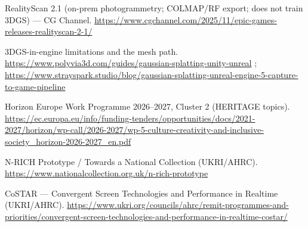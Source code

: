 \documentclass[a4paper,11pt]{article}
\begin{document}
\begin{enumerate}[leftmargin=2.2em,label={[\arabic*]}]
\item RealityScan 2.1 (on-prem photogrammetry; COLMAP/RF export; does not train 3DGS) --- CG Channel. \url{https://www.cgchannel.com/2025/11/epic-games-releases-realityscan-2-1/}
\item 3DGS-in-engine limitations and the mesh path. \url{https://www.polyvia3d.com/guides/gaussian-splatting-unity-unreal} ; \url{https://www.strayspark.studio/blog/gaussian-splatting-unreal-engine-5-capture-to-game-pipeline}
\item Horizon Europe Work Programme 2026--2027, Cluster 2 (HERITAGE topics). \url{https://ec.europa.eu/info/funding-tenders/opportunities/docs/2021-2027/horizon/wp-call/2026-2027/wp-5-culture-creativity-and-inclusive-society_horizon-2026-2027_en.pdf}
\item N-RICH Prototype / Towards a National Collection (UKRI/AHRC). \url{https://www.nationalcollection.org.uk/n-rich-prototype}
\item CoSTAR --- Convergent Screen Technologies and Performance in Realtime (UKRI/AHRC). \url{https://www.ukri.org/councils/ahrc/remit-programmes-and-priorities/convergent-screen-technologies-and-performance-in-realtime-costar/}
\end{enumerate}
\end{document}

